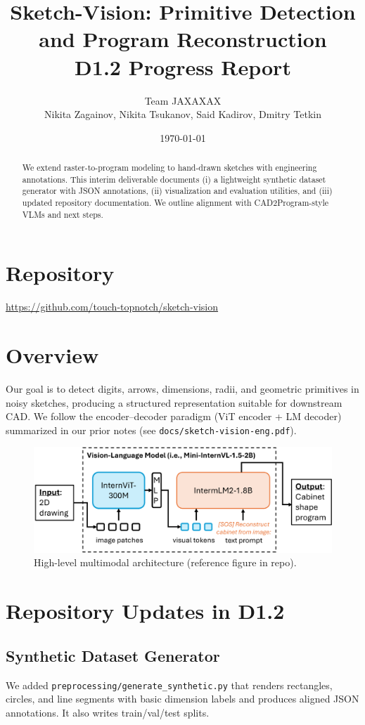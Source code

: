 \documentclass[11pt,a4paper]{article}
\title{Sketch-Vision: Primitive Detection and Program Reconstruction\\\large D1.2 Progress Report}
\author{Team JAXAXAX\\Nikita Zagainov, Nikita Tsukanov, Said Kadirov, Dmitry Tetkin}
\date{\today}
\begin{document}
\maketitle

\begin{abstract}
We extend raster-to-program modeling to hand-drawn sketches with engineering annotations. This interim deliverable documents (i) a lightweight synthetic dataset generator with JSON annotations, (ii) visualization and evaluation utilities, and (iii) updated repository documentation. We outline alignment with CAD2Program-style VLMs and next steps.
\end{abstract}

\section{Repository}
\url{https://github.com/touch-topnotch/sketch-vision}

\section{Overview}
Our goal is to detect digits, arrows, dimensions, radii, and geometric primitives in noisy sketches, producing a structured representation suitable for downstream CAD. We follow the encoder--decoder paradigm (ViT encoder + LM decoder) summarized in our prior notes (see \texttt{docs/sketch-vision-eng.pdf}).

\begin{figure}[!htbp]
  \centering
  \includegraphics[width=0.9\linewidth]{internvl.png}
  \caption{High-level multimodal architecture (reference figure in repo).}\label{fig:internvl}
\end{figure}

\section{Repository Updates in D1.2}
\subsection{Synthetic Dataset Generator}
We added \texttt{preprocessing/generate\_synthetic.py} that renders rectangles, circles, and line segments with basic dimension labels and produces aligned JSON annotations. It also writes train/val/test splits.
\end{document}
